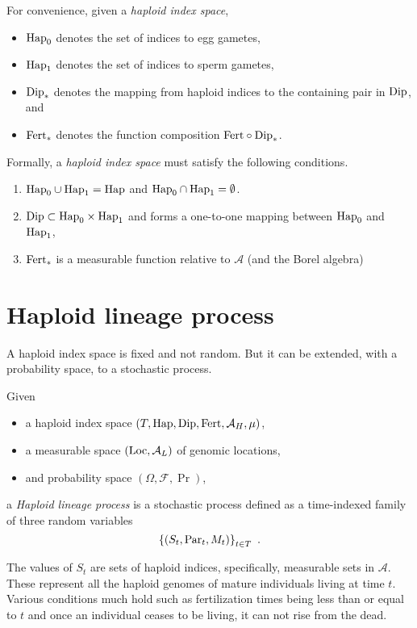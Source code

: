 \documentclass{article}
\begin{document}
For convenience, given a \emph{haploid index space},

\begin{itemize}
\item
  $\mathrm{Hap}_0$ denotes the set of indices to egg gametes,
\item
  $\mathrm{Hap}_1$ denotes the set of indices to sperm gametes,
\item
  $\mathrm{Dip}_*$ denotes the mapping from haploid indices to the containing pair in $\mathrm{Dip}$,
and
\item
  $\mathrm{Fert}_*$ denotes the function composition $\mathrm{Fert} \circ \mathrm{Dip}_*$.
\end{itemize}

Formally, a \emph{haploid index space} must satisfy the following
conditions.

\begin{enumerate}
\item
  $\mathrm{Hap}_0 \cup \mathrm{Hap}_1 = \mathrm{Hap}$ and $\mathrm{Hap}_0 \cap \mathrm{Hap}_1 = \emptyset$.
\item
  $\mathrm{Dip} \subset \mathrm{Hap}_0 \times \mathrm{Hap}_1$ and forms a one-to-one mapping
  between $\mathrm{Hap}_0$ and $\mathrm{Hap}_1$,
\item
  $\mathrm{Fert}_*$ is a measurable function relative to $\mathcal{A}$ (and the Borel algebra)
\end{enumerate}


\section{Haploid lineage process}

A haploid index space is fixed and not random. But it can be extended, with a
probability space, to a stochastic process.

Given 
\begin{itemize}
\item
  a haploid index space $(T, \mathrm{Hap}, \mathrm{Dip}, \mathrm{Fert}, \mathcal{A}_H, \mu)$,
\item
  a measurable space $(\mathrm{Loc}, \mathcal{A}_L)$ of genomic locations,
\item
  and probability space $(\Omega, \mathcal{F}, \Pr)$,
\end{itemize}
a \emph{Haploid lineage process} is a stochastic process defined as a time-indexed family
of three random variables
$$
 \left\{ (S_t, \mathrm{Par}_t, M_t) \right\}_{t \in T}
\text{ .}
$$

The values of $S_t$ are sets of haploid indices, specifically, measurable sets in
$\mathcal{A}$. These represent all the haploid genomes of mature individuals living at
time $t$. Various conditions much hold such as fertilization times being less than or
equal to $t$ and once an individual ceases to be living, it can not rise from the dead.
\end{document}
